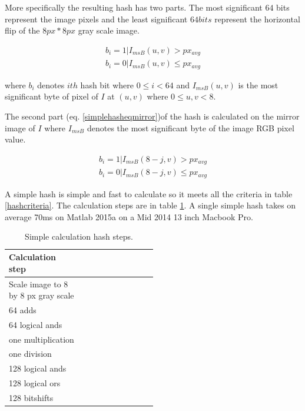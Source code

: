 \documentclass[english,12pt,a4paper,pdftex,elec,utf8]{aaltothesis}
\begin{document}
More specifically the resulting hash has two parts. The most significant $64$ bits represent the image pixels and the least significant $64bits$ represent the horizontal flip of the $8px * 8px$ gray scale image.

\begin{equation} \label{simplehasheq}
  \begin{split}
  b_{i} = 1 | I_{msB}(u,v) > px_{avg}\\
  b_{i} = 0 | I_{msB}(u,v) \leq px_{avg}
  \end{split}
\end{equation}

where $b_{i}$ denotes $ith$ hash bit where $0 \leq i < 64$ and $I_{msB}(u,v)$ is the most significant byte of pixel of $I$ at $(u,v)$ where $0 \leq u,v < 8$.

The second part (eq. \ref{simplehasheqmirror})of the hash is calculated on the mirror image of $I$ where $I_{msB}$ denotes the most significant byte of the image RGB pixel value.

\begin{equation} \label{simplehasheqmirror}
  \begin{split}
  b_{i} = 1 | I_{msB}(8-j,v) > px_{avg}\\
  b_{i} = 0 | I_{msB}(8-j,v) \leq px_{avg}
  \end{split}
\end{equation}

A simple hash is simple and fast to calculate so it meets all the criteria in table \ref{hashcriteria}. The calculation steps are in table \ref{simplesteps}. A single simple hash takes on average 70ms on Matlab 2015a on a Mid 2014 13 inch Macbook Pro.

\def\arraystretch{1.5}
\begin{table}[htb]
\caption{Simple calculation hash steps.}
\label{simplesteps}
\begin{center}
\begin{tabular}{lp{0.5\linewidth}}
  Calculation step\\
  \hline \hline
  Scale image to 8 by 8 px gray scale\\
  \hline
  64 adds\\
  \hline
  64 logical ands\\
  \hline
  one multiplication\\
  \hline
  one division\\
  \hline
  128 logical ands\\
  \hline
  128 logical ors\\
  \hline
  128 bitshifts\\
  \hline
\end{tabular}
\end{center}\end{table}
\end{document}
